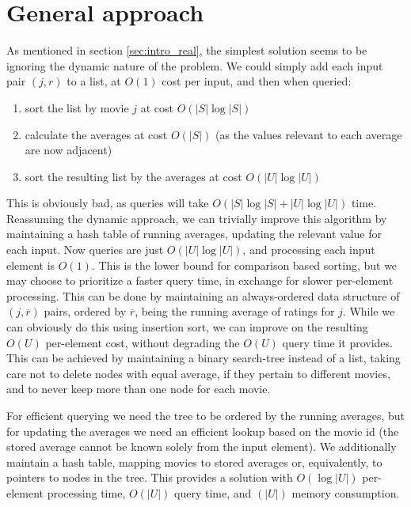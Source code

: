 \section{General approach}
As mentioned in section \ref{sec:intro_real}, the simplest solution seems to be
ignoring the dynamic nature of the problem. We could simply add each input pair
$(j,r)$ to a list, at $O(1)$ cost per input, and then when queried:
\begin{enumerate}
	\item sort the list by movie $j$ at cost $O(|S| \log |S|)$
	\item calculate the averages at cost $O(|S|)$ (as the values relevant to
		each average are now adjacent)
	\item sort the resulting list by the averages at cost $O(|U| \log |U|)$
\end{enumerate}

This is obviously bad, as queries will take $O(|S| \log |S| + |U| \log|U|)$
time. Reassuming the dynamic approach, we can trivially improve this algorithm
by maintaining a hash table of running averages, updating the relevant value for
each input. Now queries are just $O(|U| \log |U|)$, and processing each input
element is $O(1)$. This is the lower bound for comparison based sorting, but we
may choose to prioritize a faster query time, in exchange for slower per-element
processing. This can be done by maintaining an always-ordered data structure of
$(j, \overline r)$ pairs, ordered by $\overline r$, being the running average of
ratings for $j$. While we can obviously do this using insertion sort, we can
improve on the resulting $O(U)$ per-element cost, without degrading the $O(U)$
query time it provides. This can be achieved by maintaining a binary search-tree
instead of a list, taking care not to delete nodes with equal average, if they
pertain to different movies, and to never keep more than one node for each
movie.

For efficient querying we need the tree to be ordered by the
running averages, but for updating the averages we need an efficient lookup
based on the movie id (the stored average cannot be known solely from the input
element). We additionally maintain a hash table, mapping movies to stored
averages or, equivalently, to pointers to nodes in the tree. This provides a
solution with $O(\log |U|)$ per-element processing time, $O(|U|)$ query
time, and $(|U|)$ memory consumption.

